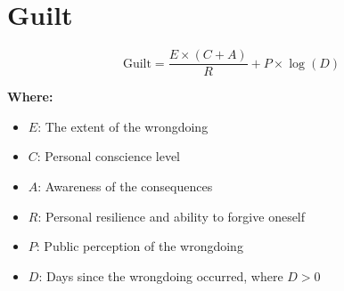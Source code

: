 \chapter{Guilt}

\begin{equation}
\text{Guilt} = \frac{E \times (C + A)}{R} + P \times \log(D)
\end{equation}

\textbf{Where:}

\begin{itemize}
    \item $E$: The extent of the wrongdoing
    \item $C$: Personal conscience level
    \item $A$: Awareness of the consequences
    \item $R$: Personal resilience and ability to forgive oneself
    \item $P$: Public perception of the wrongdoing
    \item $D$: Days since the wrongdoing occurred, where $D > 0$
\end{itemize}